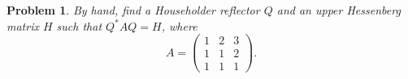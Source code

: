 \documentclass[12pt]{report}
\newtheorem{problem}{Problem}
\begin{document}
\newpage



\begin{problem}
    By hand, find a Householder reflector $Q$ and an upper Hessenberg matrix $H$ such that $Q^*AQ = H$, where
    \[ 
        A = \begin{pmatrix}
            1 & 2 & 3\\
            1 & 1 & 2\\
            1 & 1 & 1
        \end{pmatrix}.
    \]
\end{problem}
\end{document}
